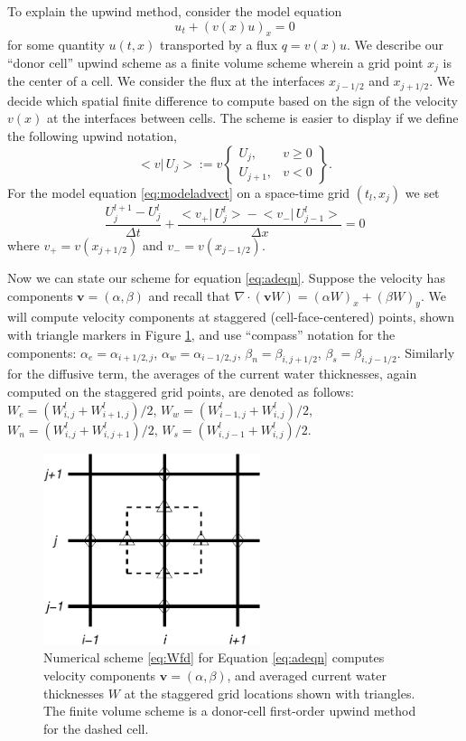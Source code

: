 \documentclass[12pt,final]{amsart}%
\newcommand\bv{\mathbf{v}}
\newcommand{\Div}{\nabla\cdot}
\begin{document}
To explain the upwind method, consider the model equation
\begin{equation} \label{eq:modeladvect}
u_t + (v(x) u)_x = 0
\end{equation}
for some quantity $u(t,x)$ transported by a flux $q = v(x) u$.  We describe our ``donor cell'' upwind scheme as a finite volume scheme \citep{LeVeque} wherein a grid point $x_j$ is the center of a cell.  We consider the flux at the interfaces $x_{j-1/2}$ and $x_{j+1/2}$.  We decide which spatial finite difference to compute based on the sign of the velocity $v(x)$ at the interfaces between cells.  The scheme is easier to display if we define the following upwind notation,
\newcommand{\up}[2]{\big<#1\big|\,#2\big>}
	$$\up{v}{U_j} := v \begin{Bmatrix} U_j, & v \ge 0 \\ U_{j+1}, & v < 0 \end{Bmatrix}.$$
For the model equation \eqref{eq:modeladvect} on a space-time grid $(t_l,x_j)$ we set
\begin{equation}\label{eq:modelfdadvect}
\frac{U_j^{l+1} - U_j^l}{\Delta t} + \frac{\up{v_+}{U_j^l} - \up{v_-}{U_{j-1}^l}}{\Delta x} = 0
\end{equation}
where $v_+ = v(x_{j+1/2})$ and $v_-=v(x_{j-1/2})$.

Now we can state our scheme for equation \eqref{eq:adeqn}.  Suppose the velocity has components $\bv = (\alpha,\beta)$ and recall that $\Div \left(\bv W\right) = (\alpha W)_x + (\beta W)_y$.  We will compute velocity components at staggered (cell-face-centered) points, shown with triangle markers in Figure \ref{fig:stencil}, and use ``compass'' notation for the components: $\alpha_e = \alpha_{i+1/2,j}$, $\alpha_w = \alpha_{i-1/2,j}$, $\beta_n = \beta_{i,j+1/2}$, $\beta_s = \beta_{i,j-1/2}$.  Similarly for the diffusive term, the averages of the current water thicknesses, again computed on the staggered grid points, are denoted as follows: $W_e = (W_{i,j}^l + W_{i+1,j}^l)/2$, $W_w = (W_{i-1,j}^l + W_{i,j}^l)/2$, $W_n = (W_{i,j}^l + W_{i,j+1}^l)/2$, $W_s = (W_{i,j-1}^l + W_{i,j}^l)/2$.

\begin{figure}[ht]
\centering
\includegraphics[width=2.5in,keepaspectratio=true]{diffstencil}
\bigskip
\caption{Numerical scheme \eqref{eq:Wfd} for Equation \eqref{eq:adeqn} computes velocity components $\bv=(\alpha,\beta)$, and averaged current water thicknesses $W$ at the staggered grid locations shown with triangles.  The finite volume scheme is a donor-cell first-order upwind method for the dashed cell.}
\label{fig:stencil}
\end{figure}
\end{document}
